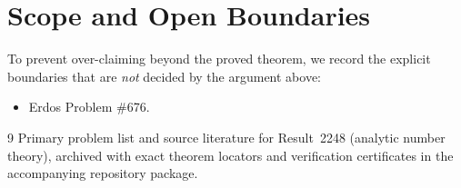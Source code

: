 \documentclass[10pt,reqno]{amsart}
\theoremstyle{definition}
\begin{document}
\section{Scope and Open Boundaries}

To prevent over-claiming beyond the proved theorem, we record the explicit boundaries that are \emph{not} decided by the argument above:
\begin{itemize}
  \item Erdos Problem \#676.
\end{itemize}

\begin{thebibliography}{9}
Primary problem list and source literature for Result~2248 (analytic number theory), archived with exact theorem locators and verification certificates in the accompanying repository package.
\end{thebibliography}
\end{document}
